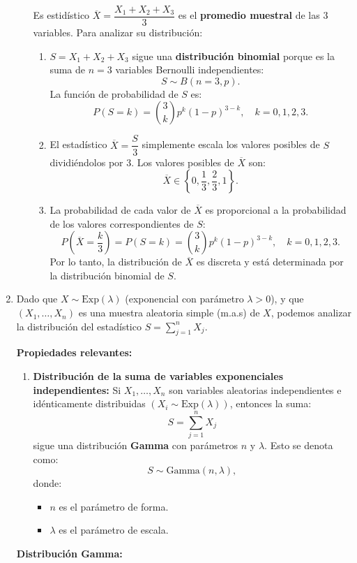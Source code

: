 \begin{enumerate}[label=\color{red}\textbf{\arabic*)}]
\begin{enumerate}[label=\color{red}\textbf{\alph*)}]
                Es estidístico $\overline{X}=\dfrac{X_1+X_2+X_3}{3}$ es el \textbf{promedio muestral} de las 3 variables. Para analizar su distribución:
                \begin{enumerate}[label=\arabic*)]
                    \item $S=X_1+X_2+X_3$ sigue una \textbf{distribución binomial} porque es la suma de $n=3$ variables Bernoulli independientes:  \[
                    S\sim B(n=3,p).
                    \] 
                    La función de probabilidad de $S$ es: \[
                    P(S=k)=\binom{3}{k} p^k(1-p)^{3-k},\quad k=0,1,2,3.
                    \] 
                \item El estadístico $\overline{X}=\dfrac{S}{3}$ simplemente escala los valores posibles de $S$ dividiéndolos por 3. Los valores posibles de $\overline{X}$ son: \[
                        \overline{X}\in \left\{ 0,\dfrac{1}{3}, \dfrac{2}{3},1 \right\}.
                \] 
            \item La probabilidad de cada valor de $\overline{X}$ es proporcional a la probabilidad de los valores correspondientes de $S$:  \[
                    P\left( \overline{X}=\dfrac{k}{3} \right) =P(S=k)=\binom{3}{k} p^k(1-p)^{3-k},\quad k=0,1,2,3.
            \] 
            Por lo tanto, la distribución de $\overline{X}$ es discreta y está determinada por la distribución binomial de $S$.
                \end{enumerate}
        \end{enumerate}
    \item {} 

        Dado que $X\sim \mathrm{Exp}(\lambda)$ (exponencial con parámetro $\lambda>0$), y que $(X_1,\dots,X_n)$ es una muestra aleatoria simple (m.a.s) de $X$, podemos analizar la distribución del estadístico  $S=\sum_{j=1}^{n} X_j$.

        \textbf{Propiedades relevantes:}
        \begin{enumerate}[label=\arabic*)]
            \item \textbf{Distribución de la suma de variables exponenciales independientes:} Si $X_1,\dots,X_n$ son variables aleatorias independientes e idénticamente distribuidas $(X_i\sim \mathrm{Exp}(\lambda))$, entonces la suma: \[
            S=\sum_{j=1}^{n} X_j
            \] sigue una distribución \textbf{Gamma} con parámetros $n$ y  $\lambda$. Esto se denota como: \[
            S\sim \mathrm{Gamma}(n,\lambda),
            \]  donde:
            \begin{itemize}[label=\textbullet]
                \item $n$ es el parámetro de forma.
                \item $\lambda$ es el parámetro de escala.
            \end{itemize}
        \end{enumerate}
        \textbf{Distribución Gamma:}


\end{enumerate}
